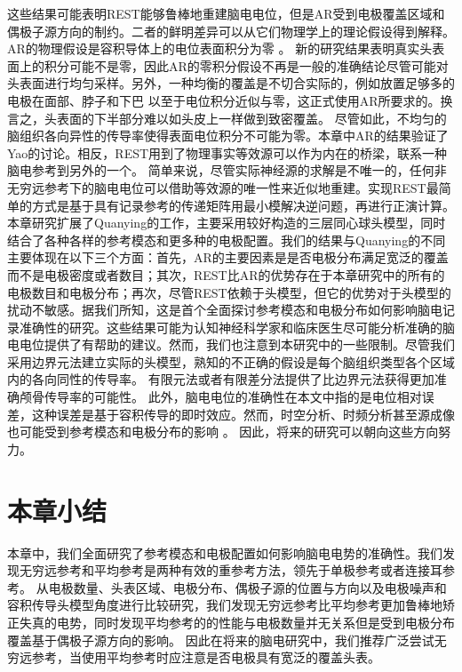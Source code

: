 这些结果可能表明REST能够鲁棒地重建脑电电位，但是AR受到电极覆盖区域和偶极子源方向的制约。二者的鲜明差异可以从它们物理学上的理论假设得到解释。
AR的物理假设是容积导体上的电位表面积分为零
。
新的研究结果表明真实头表面上的积分可能不是零，因此AR的零积分假设不再是一般的准确结论尽管可能对头表面进行均匀采样。另外，一种均衡的覆盖是不切合实际的，例如放置足够多的电极在面部、脖子和下巴 以至于电位积分近似与零，这正式使用AR所要求的。换言之，头表面的下半部分难以如头皮上一样做到致密覆盖。 尽管如此，不均匀的脑组织各向异性的传导率使得表面电位积分不可能为零。本章中AR的结果验证了Yao的讨论。相反，REST用到了物理事实等效源可以作为内在的桥梁，联系一种脑电参考到另外的一个。 简单来说，尽管实际神经源的求解是不唯一的，任何非无穷远参考下的脑电电位可以借助等效源的唯一性来近似地重建。实现REST最简单的方式是基于具有记录参考的传递矩阵用最小模解决逆问题，再进行正演计算。 本章研究扩展了Quanying的工作，主要采用较好构造的三层同心球头模型，同时结合了各种各样的参考模态和更多种的电极配置。我们的结果与Quanying的不同主要体现在以下三个方面：首先，AR的主要因素是是否电极分布满足宽泛的覆盖而不是电极密度或者数目；其次，REST比AR的优势存在于本章研究中的所有的电极数目和电极分布；再次，尽管REST依赖于头模型，但它的优势对于头模型的扰动不敏感。据我们所知，这是首个全面探讨参考模态和电极分布如何影响脑电记录准确性的研究。这些结果可能为认知神经科学家和临床医生尽可能分析准确的脑电电位提供了有帮助的建议。然而，我们也注意到本研究中的一些限制。尽管我们采用边界元法建立实际的头模型，熟知的不正确的假设是每个脑组织类型各个区域内的各向同性的传导率。 有限元法或者有限差分法提供了比边界元法获得更加准确颅骨传导率的可能性。 此外，脑电电位的准确性在本文中指的是电位相对误差，这种误差是基于容积传导的即时效应。然而，时空分析、时频分析甚至源成像也可能受到参考模态和电极分布的影响 。 因此，将来的研究可以朝向这些方向努力。
\section{本章小结}
本章中，我们全面研究了参考模态和电极配置如何影响脑电电势的准确性。我们发现无穷远参考和平均参考是两种有效的重参考方法，领先于单极参考或者连接耳参考。 从电极数量、头表区域、电极分布、偶极子源的位置与方向以及电极噪声和容积传导头模型角度进行比较研究，我们发现无穷远参考比平均参考更加鲁棒地矫正失真的电势，同时发现平均参考的的性能与电极数量并无关系但是受到电极分布覆盖基于偶极子源方向的影响。 因此在将来的脑电研究中，我们推荐广泛尝试无穷远参考，当使用平均参考时应注意是否电极具有宽泛的覆盖头表。